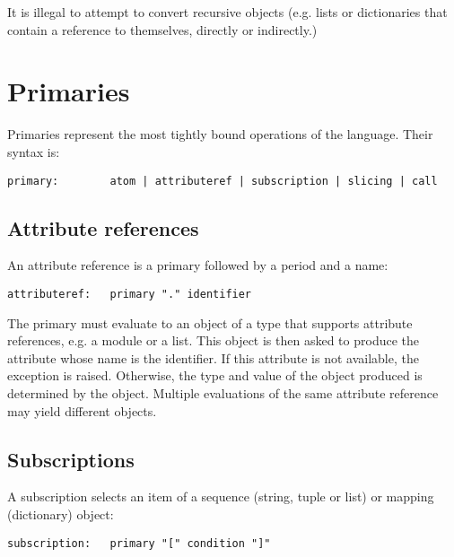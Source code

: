 It is illegal to attempt to convert recursive objects (e.g. lists or
dictionaries that contain a reference to themselves, directly or
indirectly.)

\section{Primaries} \label{primaries}

Primaries represent the most tightly bound operations of the language.
Their syntax is:

\begin{verbatim}
primary:        atom | attributeref | subscription | slicing | call
\end{verbatim}

\subsection{Attribute references}

An attribute reference is a primary followed by a period and a name:

\begin{verbatim}
attributeref:   primary "." identifier
\end{verbatim}

The primary must evaluate to an object of a type that supports
attribute references, e.g. a module or a list.  This object is then
asked to produce the attribute whose name is the identifier.  If this
attribute is not available, the exception \verb@AttributeError@ is
raised.  Otherwise, the type and value of the object produced is
determined by the object.  Multiple evaluations of the same attribute
reference may yield different objects.

\subsection{Subscriptions}

A subscription selects an item of a sequence (string, tuple or list)
or mapping (dictionary) object:

\begin{verbatim}
subscription:   primary "[" condition "]"
\end{verbatim}

